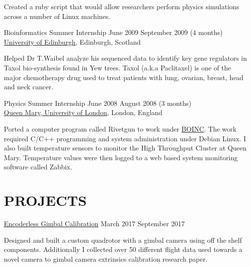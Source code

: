 \documentclass[line,margin]{cv}
\begin{document}
\begin{resume}
\vspace{0.1em}
\begin{adjustwidth}{2.0em}{2.0em}
    Created a ruby script that would allow researchers perform
    physics simulations across a number of Linux machines.
\end{adjustwidth}


\pagebreak
Bioinformatics Summer Internship
\hfill June 2009 \textemdash{} September 2009 (4 months) \\
\href{http://www.ed.ac.uk}{University of Edinburgh}, Edinburgh, Scotland

\vspace{0.1em}
\begin{adjustwidth}{2.0em}{2.0em}
    Helped Dr T.Waibel analyze his sequenced data to identify key gene regulators
    in Taxol bio-synthesis found in Yew trees. Taxol (a.k.a Paclitaxel) is 
    one of the major chemotherapy drug used to treat patients with lung, 
    ovarian, breast, head and neck cancer.
\end{adjustwidth}


Physics Summer Internship
\hfill June 2008 \textemdash{} August 2008 (3 months) \\
\href{http://www.qmul.ac.uk}{Queen Mary, University of London}, London, England

\vspace{0.1em}
\begin{adjustwidth}{2.0em}{2.0em}
    Ported a computer program called Rivetgun to work under
    \href{https://boinc.berkeley.edu/} {BOINC}\@. The work required C/C++
    programming and system administration under Debian Linux. I also built 
    temperature sensors to monitor the High Throughput Cluster at Queen Mary.
    Temperature values were then logged to a web based system monitoring 
    software called Zabbix.
\end{adjustwidth}



\section{PROJECTS}

\href{https://youtu.be/v0OLmIKHQlM}
{Encoderless Gimbal Calibration}
\hfill March 2017 \textemdash{} September 2017

\vspace{0.1em}
\begin{adjustwidth}{2.0em}{2.0em}
	Designed and built a custom quadrotor with a gimbal camera using off the shelf 
	components.	Additionally I collected over 50 different flight data used towards a novel camera to gimbal camera extrinsics calibration research paper.
\end{adjustwidth}



\end{resume}
\end{document}
